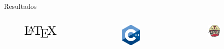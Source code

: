 \documentclass{beamer}
\begin{document}
\begin{frame}{Resultados}
\begin{columns}
        \center
        \begin{figure}
            \includegraphics[width=0.7\textwidth]{latex.png}
        \end{figure}
        \begin{figure}
            \includegraphics[width=0.5\textwidth]{cpp.png}
        \end{figure}
        \begin{figure}
            \includegraphics[width=0.5\textwidth]{travis.png}
        \end{figure}
        
    \end{columns}

\end{frame}
\end{document}
